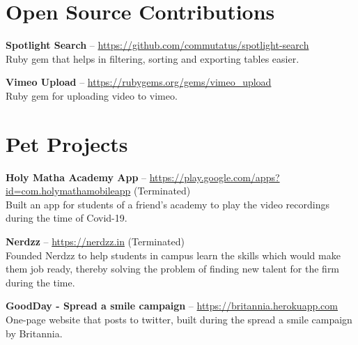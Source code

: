 \documentclass[11pt,a4paper]{moderncv}
\begin{document}

\section{Open Source Contributions}

\cvlistitem
{\textbf{Spotlight Search} -- {\small \href{https://github.com/commutatus/spotlight-search}{https://github.com/commutatus/spotlight-search}}
  \\Ruby gem that helps in filtering, sorting and exporting tables easier.
}

\vspace{5pt}

\cvlistitem
{\textbf{Vimeo Upload} -- {\small \href{https://rubygems.org/gems/vimeo\_upload}{https://rubygems.org/gems/vimeo\_upload}}
  \\Ruby gem for uploading video to vimeo.
}


\section{Pet Projects}

\cvlistitem
{\textbf{Holy Matha Academy App} -- {\small \href{https://play.google.com/store/apps/details?id=com.holymathamobileapp}{https://play.google.com/apps?id=com.holymathamobileapp}} (Terminated)
  \\Built an app for students of a friend's academy to play the video recordings during the time of Covid-19.
}

\vspace{5pt}

\cvlistitem
{\textbf{Nerdzz} -- {\small \href{https://nerdzz.in}{https://nerdzz.in}} (Terminated)
  \\Founded Nerdzz to help students in campus learn the skills which would make them job ready, thereby solving the problem of finding new talent for the firm during the time.
}

\vspace{5pt}

\cvlistitem
{\textbf{GoodDay - Spread a smile campaign} -- {\small \href{https://britannia.herokuapp.com}{https://britannia.herokuapp.com}}
  \\One-page website that posts to twitter, built during the spread a smile campaign by Britannia.
}
\end{document}
